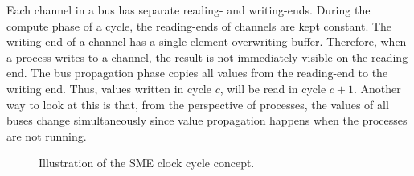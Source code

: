 Each channel in a bus has separate reading- and writing-ends. During the compute
phase of a cycle, the reading-ends of channels are kept constant. The writing
end of a channel has a single-element overwriting buffer. Therefore, when a
process writes to a channel, the result is not immediately visible on the
reading end. The bus propagation phase copies all values from the reading-end to
the writing end. Thus, values written in cycle $c$, will be read in cycle
$c+1$. Another way to look at this is that, from the perspective of processes,
the values of all buses change simultaneously since value propagation happens
when the processes are not running.%


\begin{figure}
  \centering
{}
\caption{Illustration of the SME clock cycle concept.}
\label{fig:smeclock}
\end{figure}






